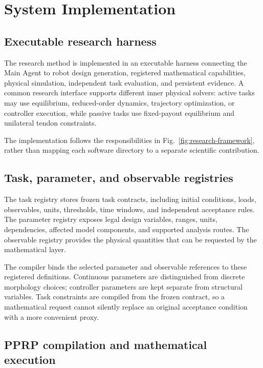 \section{System Implementation}
\label{sec:implementation}

\subsection{Executable research harness}

The research method is implemented in an executable harness connecting the Main Agent to robot design generation, registered mathematical capabilities, physical simulation, independent task evaluation, and persistent evidence. A common research interface supports different inner physical solvers: active tasks may use equilibrium, reduced-order dynamics, trajectory optimization, or controller execution, while passive tasks use fixed-payout equilibrium and unilateral tendon constraints.

The implementation follows the responsibilities in Fig.~\ref{fig:research-framework}, rather than mapping each software directory to a separate scientific contribution.

\subsection{Task, parameter, and observable registries}

The task registry stores frozen task contracts, including initial conditions, loads, observables, units, thresholds, time windows, and independent acceptance rules. The parameter registry exposes legal design variables, ranges, units, dependencies, affected model components, and supported analysis routes. The observable registry provides the physical quantities that can be requested by the mathematical layer.

The compiler binds the selected parameter and observable references to these registered definitions. Continuous parameters are distinguished from discrete morphology choices; controller parameters are kept separate from structural variables. Task constraints are compiled from the frozen contract, so a mathematical request cannot silently replace an original acceptance condition with a more convenient proxy.

\subsection{PPRP compilation and mathematical execution}

